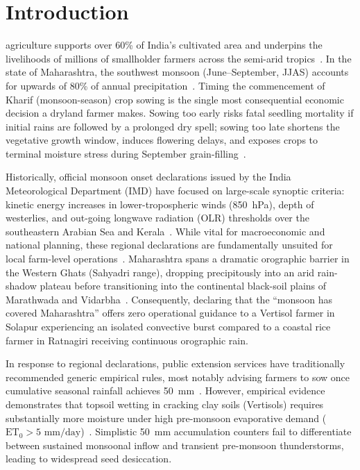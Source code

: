 \documentclass[conference]{IEEEtran}
\begin{document}
\section{Introduction}
 agriculture supports over 60\% of India's cultivated area and underpins the livelihoods of millions of smallholder farmers across the semi-arid tropics~\cite{sivakumar2005impacts}. In the state of Maharashtra, the southwest monsoon (June--September, JJAS) accounts for upwards of 80\% of annual precipitation~\cite{gadgil2003indian}. Timing the commencement of Kharif (monsoon-season) crop sowing is the single most consequential economic decision a dryland farmer makes. Sowing too early risks fatal seedling mortality if initial rains are followed by a prolonged dry spell; sowing too late shortens the vegetative growth window, induces flowering delays, and exposes crops to terminal moisture stress during September grain-filling~\cite{gadgil2000farming,rao2013rainfall}.

Historically, official monsoon onset declarations issued by the India Meteorological Department (IMD) have focused on large-scale synoptic criteria: kinetic energy increases in lower-tropospheric winds (850~hPa), depth of westerlies, and out-going longwave radiation (OLR) thresholds over the southeastern Arabian Sea and Kerala~\cite{ananthakrishnan1988onset,pai2014development}. While vital for macroeconomic and national planning, these regional declarations are fundamentally unsuited for local farm-level operations~\cite{hansen2019climate}. Maharashtra spans a dramatic orographic barrier in the Western Ghats (Sahyadri range), dropping precipitously into an arid rain-shadow plateau before transitioning into the continental black-soil plains of Marathwada and Vidarbha~\cite{gadgil2003indian,wani2003integrated}. Consequently, declaring that the ``monsoon has covered Maharashtra'' offers zero operational guidance to a Vertisol farmer in Solapur experiencing an isolated convective burst compared to a coastal rice farmer in Ratnagiri receiving continuous orographic rain.

In response to regional declarations, public extension services have traditionally recommended generic empirical rules, most notably advising farmers to sow once cumulative seasonal rainfall achieves 50~mm~\cite{crida2020contingency}. However, empirical evidence demonstrates that topsoil wetting in cracking clay soils (Vertisols) requires substantially more moisture under high pre-monsoon evaporative demand ($\text{ET}_0 > 5\text{ mm/day}$)~\cite{allen1998crop,mpkv2022package}. Simplistic 50~mm accumulation counters fail to differentiate between sustained monsoonal inflow and transient pre-monsoon thunderstorms, leading to widespread seed desiccation.
\end{document}
